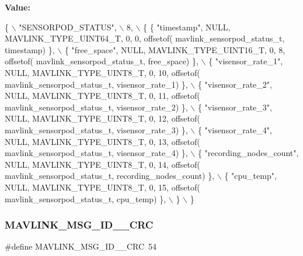 {\bfseries Value\+:}
\begin{DoxyCode}
\{ \(\backslash\)
    \textcolor{stringliteral}{"SENSORPOD\_STATUS"}, \(\backslash\)
    8, \(\backslash\)
    \{  \{ \textcolor{stringliteral}{"timestamp"}, NULL, MAVLINK_TYPE_UINT64_T, 0, 0, offsetof(
      mavlink_sensorpod_status_t, timestamp) \}, \(\backslash\)
         \{ \textcolor{stringliteral}{"free\_space"}, NULL, MAVLINK_TYPE_UINT16_T, 0, 8, offsetof(
      mavlink_sensorpod_status_t, free\_space) \}, \(\backslash\)
         \{ \textcolor{stringliteral}{"visensor\_rate\_1"}, NULL, MAVLINK_TYPE_UINT8_T, 0, 10, offsetof(
      mavlink_sensorpod_status_t, visensor\_rate\_1) \}, \(\backslash\)
         \{ \textcolor{stringliteral}{"visensor\_rate\_2"}, NULL, MAVLINK_TYPE_UINT8_T, 0, 11, offsetof(
      mavlink_sensorpod_status_t, visensor\_rate\_2) \}, \(\backslash\)
         \{ \textcolor{stringliteral}{"visensor\_rate\_3"}, NULL, MAVLINK_TYPE_UINT8_T, 0, 12, offsetof(
      mavlink_sensorpod_status_t, visensor\_rate\_3) \}, \(\backslash\)
         \{ \textcolor{stringliteral}{"visensor\_rate\_4"}, NULL, MAVLINK_TYPE_UINT8_T, 0, 13, offsetof(
      mavlink_sensorpod_status_t, visensor\_rate\_4) \}, \(\backslash\)
         \{ \textcolor{stringliteral}{"recording\_nodes\_count"}, NULL, MAVLINK_TYPE_UINT8_T, 0, 14, offsetof(
      mavlink_sensorpod_status_t, recording\_nodes\_count) \}, \(\backslash\)
         \{ \textcolor{stringliteral}{"cpu\_temp"}, NULL, MAVLINK_TYPE_UINT8_T, 0, 15, offsetof(
      mavlink_sensorpod_status_t, cpu\_temp) \}, \(\backslash\)
         \} \(\backslash\)
\}
\end{DoxyCode}
\mbox{\label{mavlink__msg__sensorpod__status_8h_a662b1643322950c31b6d63b0ec692b0f}} 
\subsubsection{M\+A\+V\+L\+I\+N\+K\+\_\+\+M\+S\+G\+\_\+\+I\+D\+\_\+\_\+\+C\+RC}
{\footnotesize\ttfamily \#define M\+A\+V\+L\+I\+N\+K\+\_\+\+M\+S\+G\+\_\+\+I\+D\+\_\+\_\+\+C\+RC~54}

